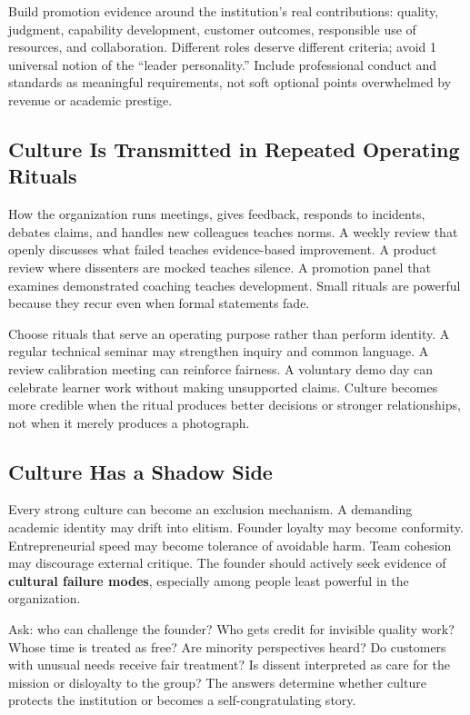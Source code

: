 Build promotion evidence around the institution's real contributions: quality, judgment, capability development, customer outcomes, responsible use of resources, and collaboration. Different roles deserve different criteria; avoid 1 universal notion of the ``leader personality.'' Include professional conduct and standards as meaningful requirements, not soft optional points overwhelmed by revenue or academic prestige.

\subsection{Culture Is Transmitted in Repeated Operating Rituals}
\label{sec:culture_operating_rituals}

How the organization runs meetings, gives feedback, responds to incidents, debates claims, and handles new colleagues teaches norms. A weekly review that openly discusses what failed teaches evidence-based improvement. A product review where dissenters are mocked teaches silence. A promotion panel that examines demonstrated coaching teaches development. Small rituals are powerful because they recur even when formal statements fade.

Choose rituals that serve an operating purpose rather than perform identity. A regular technical seminar may strengthen inquiry and common language. A review calibration meeting can reinforce fairness. A voluntary demo day can celebrate learner work without making unsupported claims. Culture becomes more credible when the ritual produces better decisions or stronger relationships, not when it merely produces a photograph.

\subsection{Culture Has a Shadow Side}
\label{sec:culture_shadow_side}

Every strong culture can become an exclusion mechanism. A demanding academic identity may drift into elitism. Founder loyalty may become conformity. Entrepreneurial speed may become tolerance of avoidable harm. Team cohesion may discourage external critique. The founder should actively seek evidence of \textbf{cultural failure modes}, especially among people least powerful in the organization.

Ask: who can challenge the founder? Who gets credit for invisible quality work? Whose time is treated as free? Are minority perspectives heard? Do customers with unusual needs receive fair treatment? Is dissent interpreted as care for the mission or disloyalty to the group? The answers determine whether culture protects the institution or becomes a self-congratulating story.

